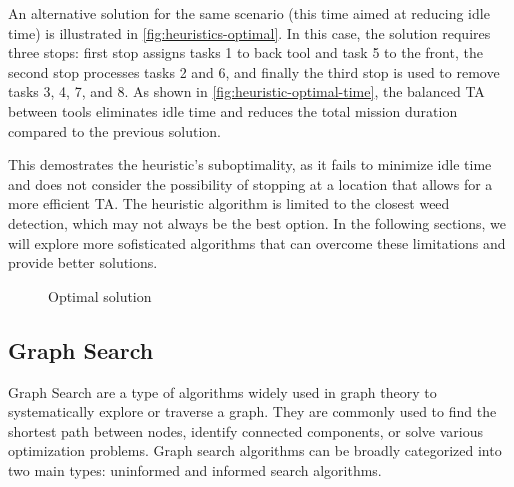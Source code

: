 An alternative solution for the same scenario (this time aimed at reducing idle time) is illustrated in \autoref{fig:heuristics-optimal}. In this case, the solution requires three stops: first stop assigns tasks 1 to back tool and task 5 to the front, the second stop processes tasks 2 and 6, and finally the third stop is used to remove tasks 3, 4, 7, and 8. As shown in \autoref{fig:heuristic-optimal-time}, the balanced \ac{TA} between tools eliminates idle time and reduces the total mission duration compared to the previous solution.

This demostrates the heuristic's suboptimality, as it fails to minimize idle time and does not consider the possibility of stopping at a location that allows for a more efficient \ac{TA}. The heuristic algorithm is limited to the closest weed detection, which may not always be the best option. In the following sections, we will explore more sofisticated algorithms that can overcome these limitations and provide better solutions.

\begin{figure}[hbt]
    \myfloatalign


    \caption{Optimal solution}
    \label{fig:heuristics-optimal}
\end{figure}

\subsection{Graph Search}
Graph Search are a type of algorithms widely used in graph theory to systematically explore or traverse a graph. They are commonly used to find the shortest path between nodes, identify connected components, or solve various optimization problems. Graph search algorithms can be broadly categorized into two main types: uninformed and informed search algorithms.

